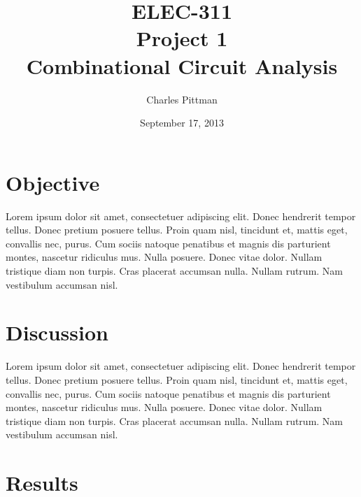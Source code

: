 \documentclass{article}
\author{Charles Pittman}
\title{ELEC-311\\ Project 1\\ Combinational Circuit Analysis}
\date{September 17, 2013}
\begin{document}
\maketitle %

\pagebreak


\renewcommand{\labelenumi}{\alph{enumi}.}

\section{Objective}
\label{sec:objective}

Lorem ipsum dolor sit amet, consectetuer adipiscing elit. Donec
hendrerit tempor tellus. Donec pretium posuere tellus. Proin quam
nisl, tincidunt et, mattis eget, convallis nec, purus. Cum sociis
natoque penatibus et magnis dis parturient montes, nascetur ridiculus
mus. Nulla posuere. Donec vitae dolor. Nullam tristique diam non
turpis. Cras placerat accumsan nulla. Nullam rutrum. Nam vestibulum
accumsan nisl.


\section{Discussion}
\label{sec:procedure}

Lorem ipsum dolor sit amet, consectetuer adipiscing elit. Donec
hendrerit tempor tellus. Donec pretium posuere tellus. Proin quam
nisl, tincidunt et, mattis eget, convallis nec, purus. Cum sociis
natoque penatibus et magnis dis parturient montes, nascetur ridiculus
mus. Nulla posuere. Donec vitae dolor. Nullam tristique diam non
turpis. Cras placerat accumsan nulla. Nullam rutrum. Nam vestibulum
accumsan nisl.

\section{Results}
\end{document}

